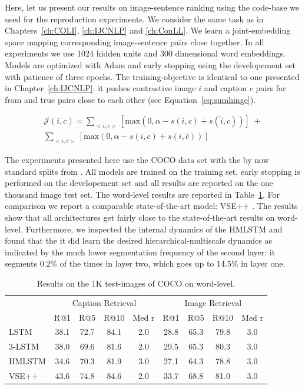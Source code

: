 Here, let us present our results on image-sentence ranking using the code-base we used for the reproduction experiments. We consider
the same task as in Chapters~\ref{ch:COLI}, \ref{ch:IJCNLP} and \ref{ch:ConLL}. We learn a joint-embedding space mapping corresponding
image-sentence pairs close together. 
In all experiments we use 1024 hidden units and 300 dimensional word embeddings. Models are optimized with Adam and early stopping using 
the developement set with patience of three epochs. 
The training-objective is identical to one presented in Chapter~\ref{ch:IJCNLP}: it pushes contrastive image $i$ and caption $c$
pairs far from and true pairs close to each other (see Equation~\ref{eq:sumhinge}).

\begin{equation*}
\label{eq:sumhinge}
\begin{split}
\mathcal{J}(i, c) = \sum_{<\hat{i}, c>}[\text{max}(0, \alpha - s(i,c) + s(\hat{i}, c))] \;+ \\ \sum_{<i, \hat{c}>}[\text{max}(0, \alpha - s(i,c) + s(i, \hat{c}))]
\end{split}
\end{equation*}

The experiments presented here use the COCO data set with the by now standard splits from \cite{karpathy2015deep}. All models are 
trained on the training set, early stopping is performed on the developement set and all results are reported on the one thousand 
image test set.
The word-level results are
reported in Table~\ref{tab:hmlstmfail}. For comparison we report a comparable state-of-the-art model: VSE++ \cite{faghri2017vse++}.
The results show that all architectures get fairly close to the state-of-the-art results on word-level. Furthermore, we inspected
the internal dynamics of the HMLSTM and found that the it did learn the desired hierarchical-multiscale dynamics as indicated by the 
much lower segmentation frequency of the second layer: it segments 0.2\% of the times in layer two, which goes up to 14.5\% in layer one.


\begin{table}[]
    \centering
	    \begin{tabular}{lcccccccc}
			& \multicolumn{4}{c}{Caption Retrieval}  & \multicolumn{4}{c}{Image Retrieval} \\
		    & R@1 & R@5 & R@10 & Med r & R@1 & R@5 & R@10 & Med r \\				            
		    LSTM & 38.1  & 72.7 &  84.1 &  2.0 & 28.8 & 65.3 & 79.8 & 3.0 \\
			3-LSTM & 38.0 & 69.6 & 81.6 & 2.0 & 29.5 & 65.3 & 80.3 & 3.0 \\
			HMLSTM & 34.6 & 70.3 & 81.9 & 3.0 & 27.1 & 64.3 & 78.8 & 3.0 \\
			VSE++ & 43.6 & 74.8 & 84.6 & 2.0 & 33.7 & 68.8 & 81.0 & 3.0
		\end{tabular}
		\caption{Results on the 1K test-images of COCO on word-level.}
	\label{tab:hmlstmfail}
\end{table}

